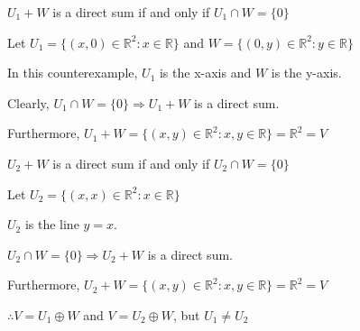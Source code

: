 \documentclass{article}
\begin{document}
\begin{enumerate}[nolistsep]
		$U_1 + W$ is a direct sum if and only if $U_1 \cap W = \{0\}$
		
		Let $U_1 = \{(x,0) \in \mathbb{R}^2 : x \in \mathbb{R}\}$ and $W = \{(0,y) \in \mathbb{R}^2 : y \in \mathbb{R}\}$		
		
		In this counterexample, $U_1$ is the x-axis and $W$ is the y-axis.
		
		Clearly, $U_1 \cap W = \{0\} \Rightarrow U_1 + W$ is a direct sum.
		
		Furthermore, $U_1 + W = \{(x, y) \in \mathbb{R}^2 : x,y \in \mathbb{R}\} = \mathbb{R}^2 = V$
		
		$U_2 + W$ is a direct sum if and only if $U_2 \cap W = \{0\}$
		
		Let $U_2 = \{(x, x) \in \mathbb{R}^2 : x \in \mathbb{R}\}$
		
		$U_2$ is the line $y = x$. 
		
		$U_2 \cap W = \{0\} \Rightarrow U_2 + W$ is a direct sum.
		
		Furthermore, $U_2 + W = \{(x, y) \in \mathbb{R}^2 : x,y \in \mathbb{R}\} = \mathbb{R}^2 = V$
		
		$\therefore V = U_1 \oplus W$ and $V = U_2 \oplus W$, but $U_1 \neq U_2$
	\end{enumerate}
\end{document}
